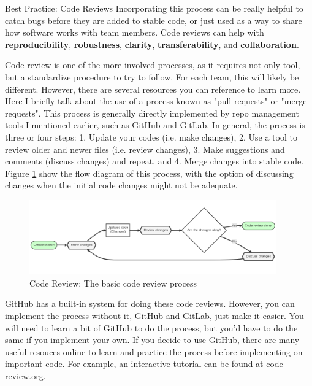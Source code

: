 \documentclass[final]{beamer}
\newlength{\colwidth}
\begin{document}
\begin{frame}[t]
\begin{columns}[t]
\begin{column}{\colwidth}
\begin{block}{Best Practice: Code Reviews}
    Incorporating this process can be really helpful to catch bugs before they
    are added to stable code, or just used as a way to share how software works
    with team members.
    Code reviews can help with \textbf{reproducibility},
    \textbf{robustness}, \textbf{clarity}, \textbf{transferability}, and
    \textbf{collaboration}.
  
    Code review is one of the more involved processes, as it requires not only
    tool, but a standardize procedure to try to follow.
    For each team, this will likely be different.
    However, there are several resources you can reference to learn more.
    Here I briefly talk about the use of a process known as "pull requests" or
    "merge requests".
    This process is generally directly implemented by repo management tools I
    mentioned earlier, such as GitHub and GitLab.
    In general, the process is three or four steps:
    1. Update your codes (i.e. make changes), 2. Use a tool to review older
    and newer files (i.e. review changes), 3. Make suggestions and comments
    (discuss changes) and repeat, and 4. Merge changes into stable code.
    Figure \ref*{fig:code-review} show the flow diagram of this process, with
    the option of discussing changes when the initial code changes might not be
    adequate.

    \begin{figure}
      \centering
      \includegraphics[width=0.95\textwidth]{tess2024/code-review-flow-diagram.png}
      \caption{Code Review: The basic code review process}
      \label{fig:code-review}
    \end{figure}
    
    GitHub has a built-in system for doing these code reviews.
    However, you can implement the process without it, GitHub and GitLab, just
    make it easier.
    You will need to learn a bit of GitHub to do the process, but you'd have to
    do the same if you implement your own.
    If you decide to use GitHub, there are many useful resouces online to learn
    and practice the process before implementing on important code.
    For example, an interactive tutorial can be found at
    \href{https://code-review.org}{code-review.org}.


\end{block}
\end{column}
\end{columns}
\end{frame}
\end{document}
